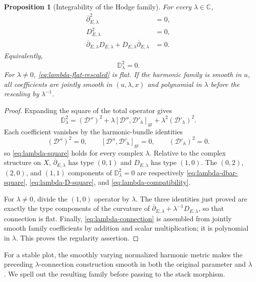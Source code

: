 \documentclass[11pt,reqno]{amsart}
\newtheorem{proposition}[theorem]{Proposition}
\theoremstyle{definition}
\theoremstyle{remark}
\newcommand{\C}{\mathbb C}
\newcommand{\cD}{\mathcal D}
\newcommand{\ddbar}{\overline\partial}
\begin{document}
\begin{proposition}[Integrability of the Hodge family]\label{prop:lambda-flatness}
For every $\lambda\in\C$,
\begin{align}
  \ddbar_{E,\lambda}^2&=0,\label{eq:lambda-dbar-square}\\
  D_{E,\lambda}^2&=0,\label{eq:lambda-D-square}\\
  \ddbar_{E,\lambda}D_{E,\lambda}
  +D_{E,\lambda}\ddbar_{E,\lambda}&=0.\label{eq:lambda-compatibility}
\end{align}
Equivalently,
\begin{equation}\label{eq:lambda-square}
  \mathbb D_\lambda^2=0.
\end{equation}
For $\lambda\ne0$, \eqref{eq:lambda-flat-rescaled} is flat.  If the harmonic family is smooth in $u$, all coefficients are jointly smooth in $(u,\lambda,x)$ and polynomial in $\lambda$ before the rescaling by $\lambda^{-1}$.
\end{proposition}

\begin{proof}
Expanding the square of the total operator gives
\[
 \mathbb D_\lambda^2
 = (\cD'')^2
 +\lambda[\cD'',\cD'_h]_{\mathrm{gr}}
 +\lambda^2(\cD'_h)^2.
\]
Each coefficient vanishes by the harmonic-bundle identities
\[
  (\cD'')^2=0,
  \qquad
  [\cD'',\cD'_h]_{\mathrm{gr}}=0,
  \qquad
  (\cD'_h)^2=0.
\]
so \eqref{eq:lambda-square} holds for every complex $\lambda$.
Relative to the complex structure on $X$, $\ddbar_{E,\lambda}$ has type
$(0,1)$ and $D_{E,\lambda}$ has type $(1,0)$.  The $(0,2)$, $(2,0)$,
and $(1,1)$ components of $\mathbb D_\lambda^2=0$ are respectively
\eqref{eq:lambda-dbar-square}, \eqref{eq:lambda-D-square}, and
\eqref{eq:lambda-compatibility}.

For $\lambda\ne0$, divide the $(1,0)$ operator by $\lambda$.  The three
identities just proved are exactly the type components of the curvature
of $\ddbar_{E,\lambda}+\lambda^{-1}D_{E,\lambda}$, so that connection is
flat.  Finally, \eqref{eq:lambda-connection} is assembled from jointly
smooth family coefficients by addition and scalar multiplication; it
is polynomial in $\lambda$.  This proves the regularity assertion.
\end{proof}


For a stable plot, the smoothly varying normalized harmonic metric makes the preceding $\lambda$-connection construction smooth in both the original parameter and $\lambda$.  We spell out the resulting family before passing to the stack morphism.
\end{document}
